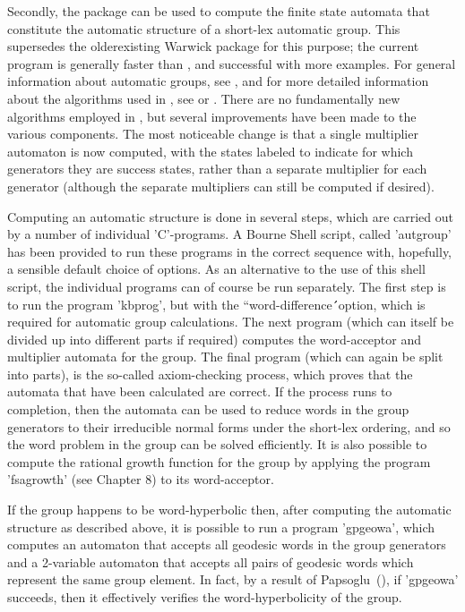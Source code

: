 Secondly, the package can be used to compute the finite state automata
that constitute the automatic structure of a short-lex automatic group.
This supersedes the olderexisting Warwick {\Automata} package for this purpose;
the current program is generally faster than {\Automata}, and successful with
more examples. For general information about automatic groups, see
\cite{ECHLPT92}, and for more detailed information about the algorithms
used in {\Automata}, see \cite{EHR91} or \cite{Holt94}. There are 
no fundamentally new algorithms employed in {\KBMAG}, but several
improvements have been made to the various components. The most
noticeable change is that a single multiplier automaton is now computed,
with the states labeled to indicate for which generators they are success
states, rather than a separate multiplier for each generator (although the
separate multipliers can still be computed if desired).

Computing an automatic structure is done in several steps, which are
carried out by a number of individual 'C'-programs. A Bourne Shell script,
called 'autgroup' has been provided to run these programs in the correct
sequence with, hopefully, a sensible default choice of options. As an
alternative to the use of this shell script, the individual programs can of
course be run separately. The first step is to run the program
'kbprog', but with the ``word-difference\'\'\ option, which is required
for automatic group calculations. The next program (which can itself be
divided up into different parts if required) computes the word-acceptor
and multiplier automata for the group. The final program (which can again
be split into parts), is the so-called axiom-checking process, which proves
that the automata that have been calculated are correct.
If the process runs to completion, then the automata can be used to reduce
words in the group generators to their irreducible normal forms under the
short-lex ordering, and so the word problem in the group can be solved
efficiently. It is also possible to compute the rational growth function
for the group by applying the program 'fsagrowth' (see Chapter 8) to its
word-acceptor.

If the group happens to be word-hyperbolic then,
after computing the automatic structure as described above, it is
possible to run a program 'gpgeowa', which computes an automaton that accepts
all geodesic words in the group generators and a 2-variable automaton that
accepts all pairs of geodesic words which represent the same group element.
In fact, by a result of Papsoglu~(\cite{PAP}), if 'gpgeowa'
succeeds, then it effectively verifies the word-hyperbolicity of the
group.
 
